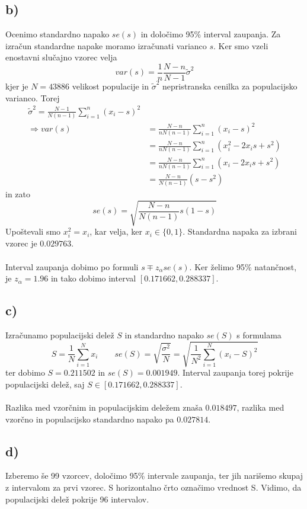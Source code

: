\documentclass[A4paper, 11pt]{article}
\begin{document}
\subsection*{b)}
Ocenimo standardno napako $se(s)$ in določimo 95\% interval zaupanja. Za izračun standardne napake moramo izračunati varianco $s$. Ker smo vzeli enostavni slučajno vzorec velja
\[ var(s) = \frac{1}{n} \frac{N - n}{N - 1} \tilde{\sigma}^2 \]
kjer je $N=43886$ velikost populacije in $\tilde{\sigma}^2$ nepristranska cenilka za populacijsko varianco. Torej
\[ 
\begin{split}
\tilde{\sigma}^2 = \frac{N - 1}{N (n - 1)} \sum_{i=1}^{n} (x_i - s)^2 \\
\Rightarrow var(s) & = \frac{N - n}{n N (n - 1)} \sum_{i=1}^{n} (x_i - s)^2 \\
		         & = \frac{N - n}{n N (n - 1)} \sum_{i=1}^{n} (x_i^2 - 2x_i s + s^2) \\
		         & = \frac{N - n}{n N (n - 1)} \sum_{i=1}^{n} (x_i - 2x_i s + s^2) \\
		         & = \frac{N - n}{N (n - 1)} (s - s^2)
\end{split}
\]
in zato
\[ se(s) = \sqrt{ \frac{N - n}{N (n - 1)} s (1 - s)} \]
Upoštevali smo $x_i ^2 = x_i$, kar velja, ker $x_i \in \{0,1\}$. Standardna napaka za izbrani vzorec je $0.029763$. \\
\\ %
Interval zaupanja dobimo po formuli $s \mp z_\alpha se(s)$. Ker želimo 95\% natančnost, je $z_\alpha = 1.96$ in tako dobimo interval $[0.171662, 0.288337]$.

\subsection*{c)}
Izračunamo populacijski delež $S$ in standardno napako $se(S)$ s formulama
\[ S = \frac{1}{N} \sum_{i=1}^{N} x_i  \qquad se(S) = \sqrt{\frac{\sigma ^2}{N}} = \sqrt{\frac{1}{N^2} \sum_{i=1}^{N} (x_i - S)^2} \]
ter dobimo $S=0.211502$ in $se(S)=0.001949$. Interval zaupanja torej pokrije populacijski delež, saj $S \in [0.171662, 0.288337]$. \\
\\
Razlika med vzorčnim in populacijskim deležem znaša $0.018497$, razlika med vzorčno in populacijsko standardno napako pa $0.027814$.

\subsection*{d)}
Izberemo še 99 vzorcev, določimo 95\% intervale zaupanja, ter jih narišemo skupaj z intervalom za prvi vzorec. S horizontalno črto označimo vrednost S. Vidimo, da populacijski delež pokrije 96 intervalov.
\end{document}
